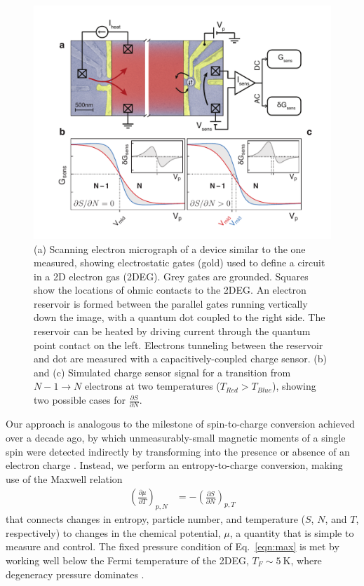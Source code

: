 \documentclass[twocolumn,showpacs,amsmath,amssymb,prl,aps,superscriptaddress]{revtex4-1}
\begin{document}
\begin{figure}[!]
        \includegraphics[width=1.0\columnwidth]{../figures/figure_1_annotated.pdf}
        \caption{\label{fig:fig1}(a) Scanning electron micrograph of a device similar to the one measured, showing electrostatic gates (gold) used to define a circuit in a 2D electron gas (2DEG). Grey gates are grounded. Squares show the locations of ohmic contacts to the 2DEG. An electron reservoir is formed between the parallel gates running vertically down the image, with a quantum dot coupled to the right side. The reservoir can be heated by driving current through the quantum point contact on the left.  Electrons tunneling between the reservoir and dot are measured with a capacitively-coupled charge sensor. (b) and (c) Simulated charge sensor signal for a transition from $N-1 \rightarrow N$ electrons at two temperatures ($T_{Red} > T_{Blue}$), showing two possible cases for $\frac{\partial S}{\partial N}$.}
\end{figure}

Our approach is analogous to the milestone of spin-to-charge conversion achieved over a decade ago, by which unmeasurably-small magnetic moments of a single spin were detected indirectly by transforming into the presence or absence of an electron charge \cite{Elzerman2004, Ono2004}.  Instead, we perform an entropy-to-charge conversion, making use of the Maxwell relation
%
\begin{align}
\label{eqn:max}
        \left(\frac{\partial \mu}{\partial T}\right)_{p,N} &= -\left(\frac{\partial S}{\partial N}\right)_{p,T}
\end{align}
%
that connects changes in entropy, particle number, and temperature ($S$, $N$, and $T$, respectively) to changes in the chemical potential, $\mu$, a quantity that is simple to measure and control. The fixed pressure condition of Eq.~\ref{eqn:max} is met by working well below the Fermi temperature of the 2DEG, $T_F \sim \SI{5}{\kelvin}$, where degeneracy pressure dominates \cite{Landau1969}.
\end{document}
